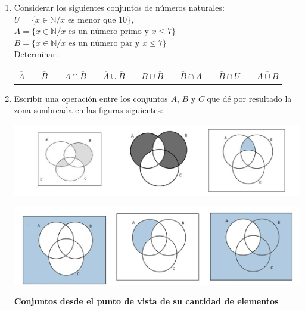\documentclass[12pt]{article}
\theoremstyle{definition}
\begin{document}
\begin{enumerate}
\item  Considerar los siguientes conjuntos de números naturales: \\
$U =  \{x \in \mathbb{N} / x  \text{ es menor que 10} \}$, \\
$A =  \{x \in \mathbb{N} / x  \text{ es un número primo y } x \leq 7 \}$\\
$B =  \{x \in \mathbb{N} / x  \text{ es un número par y }  x \leq 7 \}$\\

Determinar:
\begin{table}[ H]
\begin{center} 
\begin{tabular} { c c c c c c c c c c c c c c c }
 $\overline A$ &&  $\overline B$ &&  $A \cap \overline B$ && $\overline A \cup  \overline B$ && $B \cup \overline B$ &&
 $\overline B \cap A$ &&  $\overline B \cap U$ &&  $\overline {A \cup B}$ 
 \end{tabular} 
\end{center} 
\end{table}

\item Escribir una operación entre los conjuntos $A$, $B$ y $C$ que dé por resultado la zona sombreada en las figuras siguientes:
 \begin{center} 
\includegraphics[width=1\textwidth]{tp1_fig11a.jpg} 
\end{center}
\begin{center} 
\includegraphics[width=1\textwidth]{tp1_fig11b.jpg} 
\end{center}

\textbf{Conjuntos desde el punto de vista de su cantidad de elementos} \\


\end{enumerate}
\end{document}
